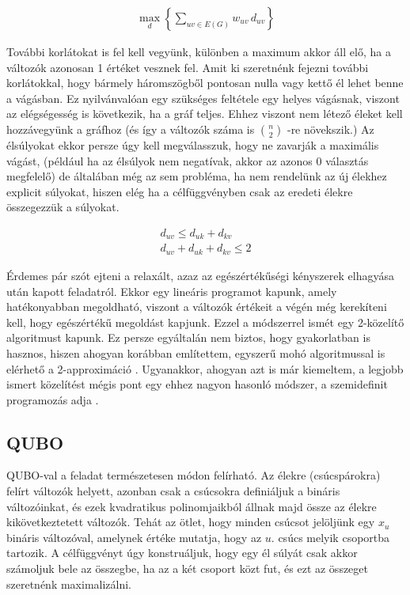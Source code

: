 \begin{align}
	\max_{d} \left\{ \sum_{uv\in E(G)}{w_{uv} \, d_{uv}}\right\}
\end{align}

További korlátokat is fel kell vegyünk, különben a maximum akkor áll elő, ha a változók azonosan 1 értéket vesznek fel.
Amit ki szeretnénk fejezni további korlátokkal, hogy bármely háromszögből pontosan nulla vagy kettő él lehet benne a vágásban. Ez nyilvánvalóan egy szükséges feltétele egy helyes vágásnak, viszont az elégségesség is következik, ha a gráf teljes. Ehhez viszont nem létező éleket kell hozzávegyünk a gráfhoz (és így a változók száma is $\binom{n}{2}$ -re növekszik.) Az élsúlyokat ekkor persze úgy kell megválasszuk, hogy ne zavarják a maximális vágást, (például ha az élsúlyok nem negatívak, akkor az azonos 0 választás megfelelő) de általában még az sem probléma, ha nem rendelünk az új élekhez explicit súlyokat, hiszen elég ha a célfüggvényben csak az eredeti élekre összegezzük a súlyokat.

\begin{align}
 d_{uv} \leq d_{uk}+d_{kv}  \\
 d_{uv}+d_{uk}+d_{kv} \leq 2  
\end{align}

Érdemes pár szót ejteni a relaxált, azaz az egészértékűségi kényszerek elhagyása után kapott feladatról. Ekkor egy lineáris programot kapunk, amely hatékonyabban megoldható, viszont a változók értékeit a végén még kerekíteni kell, hogy egészértékű megoldást kapjunk. Ezzel a módszerrel ismét egy 2-közelítő algoritmust kapunk. Ez persze egyáltalán nem biztos, hogy gyakorlatban is hasznos, hiszen ahogyan korábban említettem, egyszerű mohó algoritmussal is elérhető a 2-approximáció \cite{10.5555/1283383.1283390, POLJAK1994191}.
Ugyanakkor, ahogyan azt is már kiemeltem, a legjobb ismert közelítést mégis pont egy ehhez nagyon hasonló módszer, a szemidefinit programozás adja \cite{10.1145/227683.227684}.


\subsection{QUBO}\label{sec:theoryMaxCutQUBO}

QUBO-val a feladat természetesen módon felírható. Az élekre (csúcspárokra) felírt változók helyett, azonban csak a csúcsokra definiáljuk a bináris változóinkat, és ezek kvadratikus polinomjaikból állnak majd össze az élekre kikövetkeztetett változók. Tehát az ötlet, hogy minden csúcsot jelöljünk egy $x_u$ bináris változóval, amelynek értéke mutatja, hogy az $u.$ csúcs melyik csoportba tartozik. A célfüggvényt úgy konstruáljuk, hogy egy él súlyát csak akkor számoljuk bele az összegbe, ha az a két csoport közt fut, és ezt az összeget szeretnénk maximalizálni.

